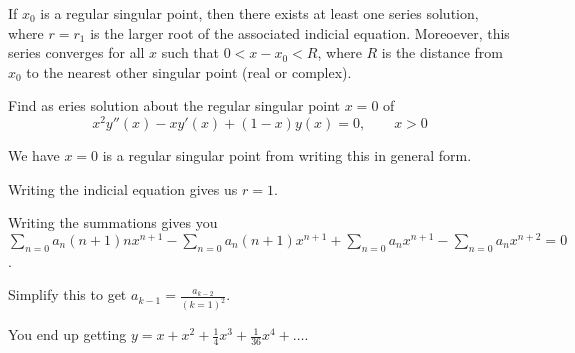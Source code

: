 \documentclass[../diffeq.tex]{subfiles}
\begin{document}
\begin{theorem}
    If $x_0$ is a regular singular point, then there exists at least one series solution, where $r=r_1$ is the larger root of the associated indicial equation. Moreoever, this series converges for all $x$ such that 
    $0<x-x_0<R$, where $R$ is the distance from $x_0$ to the nearest other singular point (real or complex).
\end{theorem}

\begin{example}
    Find as eries solution about the regular singular point $x=0$ of 
    \[ x^2y''(x)-xy'(x)+(1-x)y(x)=0, \qquad x>0 \]

    We have $x=0$ is a regular singular point from writing this in general form.

    Writing the indicial equation gives us $r=1$.

    Writing the summations gives you $\sum_{n=0}a_n(n+1)nx^{n+1}-\sum_{n=0}a_n(n+1)x^{n+1}+\sum_{n=0}a_n x^{n+1}-\sum_{n=0}a_n x^{n+2}=0$.

    Simplify this to get $a_{k-1}=\frac{a_{k-2}}{(k=1)^2}$.

    You end up getting $y=x+x^2+\frac{1}{4}x^3+\frac{1}{36}x^4+\dots$.
\end{example}
\end{document}
